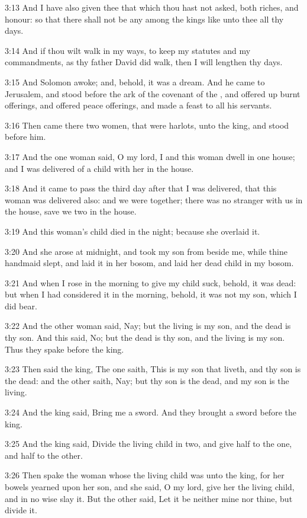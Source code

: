 3:13 And I have also given thee that which thou hast not asked, both riches, and honour: so that there shall not be any among the kings like unto thee all thy days.

3:14 And if thou wilt walk in my ways, to keep my statutes and my commandments, as thy father David did walk, then I will lengthen thy days.

3:15 And Solomon awoke; and, behold, it was a dream. And he came to Jerusalem, and stood before the ark of the covenant of the \LORD, and offered up burnt offerings, and offered peace offerings, and made a feast to all his servants.

3:16 Then came there two women, that were harlots, unto the king, and stood before him.

3:17 And the one woman said, O my lord, I and this woman dwell in one house; and I was delivered of a child with her in the house.

3:18 And it came to pass the third day after that I was delivered, that this woman was delivered also: and we were together; there was no stranger with us in the house, save we two in the house.

3:19 And this woman's child died in the night; because she overlaid it.

3:20 And she arose at midnight, and took my son from beside me, while thine handmaid slept, and laid it in her bosom, and laid her dead child in my bosom.

3:21 And when I rose in the morning to give my child suck, behold, it was dead: but when I had considered it in the morning, behold, it was not my son, which I did bear.

3:22 And the other woman said, Nay; but the living is my son, and the dead is thy son. And this said, No; but the dead is thy son, and the living is my son. Thus they spake before the king.

3:23 Then said the king, The one saith, This is my son that liveth, and thy son is the dead: and the other saith, Nay; but thy son is the dead, and my son is the living.

3:24 And the king said, Bring me a sword. And they brought a sword before the king.

3:25 And the king said, Divide the living child in two, and give half to the one, and half to the other.

3:26 Then spake the woman whose the living child was unto the king, for her bowels yearned upon her son, and she said, O my lord, give her the living child, and in no wise slay it. But the other said, Let it be neither mine nor thine, but divide it.

